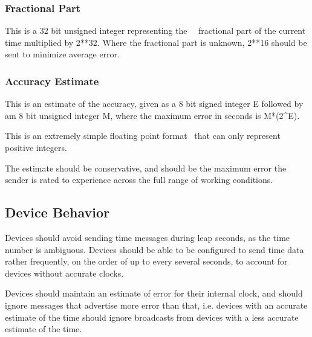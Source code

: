 \documentclass{article}
\begin{document}
\bigskip


\bigskip


\bigskip


\bigskip


\bigskip


\bigskip


\bigskip


\bigskip


\bigskip

\subsubsection{Fractional Part}
This is a 32 bit unsigned integer representing the \ \ fractional part of the current time multiplied by 2**32. Where the fractional part is unknown, 2**16 should be sent to minimize average error.

\subsubsection{Accuracy Estimate}
This is an estimate of the accuracy, given as a 8 bit signed integer E followed by am 8 bit unsigned integer M, where the maximum error in seconds is M*(2\^{}E).

This is an extremely simple floating point format \ that can only represent positive integers.

The estimate should be conservative, and should be the maximum error the sender is rated to experience across the full range of working conditions.

\subsection{Device Behavior}
Devices should avoid sending time messages during leap seconds, as the time number is ambiguous. Devices should be able to be configured to send time data rather frequently, on the order of up to every several seconds, to account for devices without accurate clocks.

Devices should maintain an estimate of error for their internal clock, and should ignore messages that advertise more error than that, i.e. devices with an accurate estimate of the time should ignore broadcasts from devices with a less accurate estimate of the time.
\end{document}
